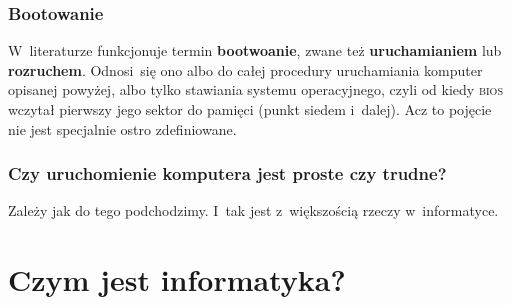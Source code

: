 \documentclass[10pt,t]{beamer}
\begin{document}
\begin{frame}
  \frametitle{Bootowanie}


  W~literaturze funkcjonuje termin \textbf{bootwoanie}, zwane też
  \textbf{uruchamianiem} lub \textbf{rozruchem}. Odnosi~się ono albo do
  całej procedury uruchamiania komputer opisanej powyżej, albo tylko
  stawiania systemu operacyjnego, czyli od kiedy \textsc{bios} wczytał
  pierwszy jego sektor do pamięci (punkt siedem i~dalej). Acz to pojęcie
  nie jest specjalnie ostro zdefiniowane.

\end{frame}





\begin{frame}
  \frametitle{Czy uruchomienie komputera jest proste czy trudne?}


  Zależy jak do tego podchodzimy. I~tak jest z~większością rzeczy
  w~informatyce.

\end{frame}










\section{Czym jest informatyka?}
\end{document}

